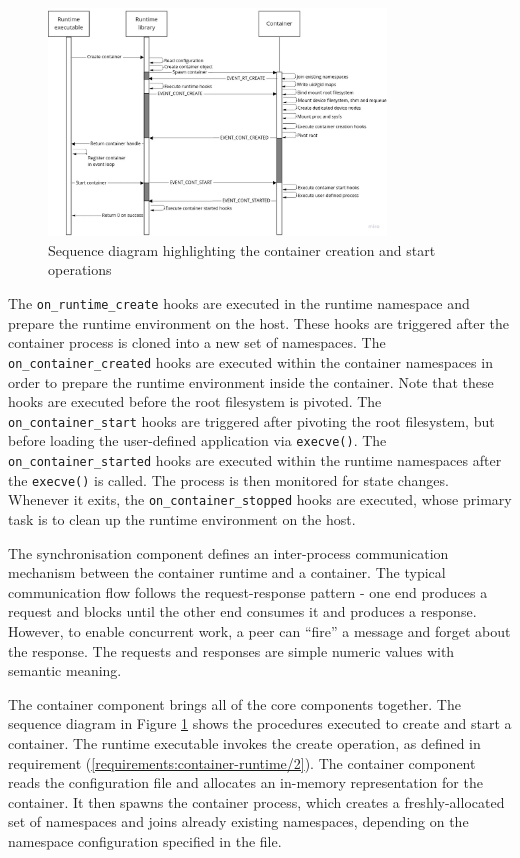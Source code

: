 \begin{figure}[H]
    \centering
    \includegraphics[width=0.8\textwidth]{images/concept/container-create-start-sequence-diagram.jpg}
    \caption{Sequence diagram highlighting the container creation and start operations}
    \label{images:concept/container-create-start-sequence-diagram.jpg}
\end{figure}

 The \verb|on_runtime_create| hooks are executed in the runtime namespace 
and prepare the runtime environment on the host. These hooks are triggered after the container process 
is cloned into a new set of namespaces. The \verb|on_container_created| hooks are executed within 
the container namespaces in order to prepare the runtime environment inside the container.
Note that these hooks are executed before the root filesystem is pivoted.
The \verb|on_container_start| hooks are triggered after pivoting the root filesystem, but before 
loading the user-defined application via \verb|execve()|. The \verb|on_container_started| hooks 
are executed within the runtime namespaces after the \verb|execve()| is called. 
The process is then monitored for state changes. Whenever it exits, the \verb|on_container_stopped|
hooks are executed, whose primary task is to clean up the runtime environment on the host. 

The synchronisation component defines an inter-process communication mechanism between 
the container runtime and a container. The typical communication flow follows the request-response pattern - 
one end produces a request and blocks until the other end consumes it and produces a response.
However, to enable concurrent work, a peer can \enquote{fire} a message and forget about the response.
The requests and responses are simple numeric values with semantic meaning. 

The container component brings all of the core components together. The sequence diagram in 
Figure \ref{images:concept/container-create-start-sequence-diagram.jpg} shows the procedures 
executed to create and start a container. The runtime executable invokes the create
operation, as defined in requirement (\ref{requirements:container-runtime/2}). 
The container component reads the configuration file and allocates 
an in-memory representation for the container. It then spawns the container process, which creates 
a freshly-allocated set of namespaces and joins already existing namespaces, depending on the namespace configuration 
specified in the file.

